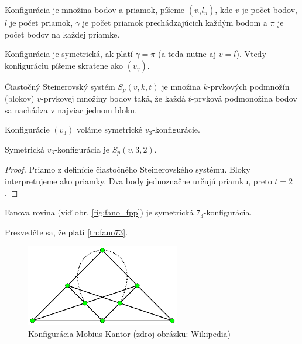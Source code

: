 \begin{definition}
	Konfigurácia je množina bodov a priamok, píšeme $(v_\gamma l_\pi)$, kde $v$ je počet bodov, $l$ je počet priamok, $\gamma$ je počet priamok prechádzajúcich každým bodom a $\pi$ je počet bodov na každej priamke.
\end{definition}

\begin{definition}
	Konfigurácia je symetrická, ak platí $\gamma = \pi$ (a teda nutne aj $v = l$). Vtedy konfiguráciu píšeme skratene ako $(v_\gamma)$.
\end{definition}

\begin{definition}
	Čiastočný Steinerovský systém $S_p(v, k, t)$ je množina $k$-prvkových podmnožín (blokov) $v$-prvkovej množiny bodov taká, že každá $t$-prvková podmonožina bodov sa nachádza v najviac jednom bloku.
\end{definition}

Konfigurácie $(v_3)$ voláme symetrické $v_3$-konfigurácie.

\begin{theorem}
	Symetrická $v_3$-konfigurácia je $S_p(v, 3, 2)$.
\end{theorem}

\begin{proof}
	Priamo z definície čiastočného Steinerovského systému. Bloky interpretujeme ako priamky. Dva body jednoznačne určujú priamku, preto $t = 2$.
\end{proof}

\begin{theorem}
	\label{th:fano73}
	Fanova rovina (viď obr. \ref{fig:fano_fpp}) je symetrická $7_3$-konfigurácia.
\end{theorem}

\begin{exercise}
	Presvedčte sa, že platí \ref{th:fano73}.
\end{exercise}

\begin{figure}
	\centering
	\includegraphics[width=0.6\textwidth]{mobius_kantor_configuration}
	\caption{Konfigurácia Mobius-Kantor (zdroj obrázku: Wikipedia)}
	\label{img:mobiuskantorconfiguration}
\end{figure}

